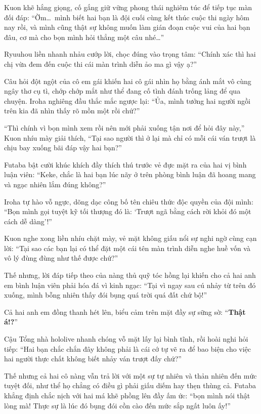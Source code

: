 \documentclass[../main.tex]{subfiles}
\begin{document}
Kuon khẽ hắng giọng, cố gắng giữ vững phong thái nghiêm túc để tiếp tục màn đối đáp: ``Ờm\dots\ mình biết hai bạn là đội cuối cùng kết thúc cuộc thi ngày hôm nay rồi, và mình cũng thật sự không muốn làm gián đoạn cuộc vui của hai bạn đâu, cơ mà cho bọn mình hỏi thẳng một câu nhé\dots''

Ryuuhou liền nhanh nhảu cướp lời, chọc đúng vào trọng tâm: ``Chính xác thì hai chị vừa đem đến cuộc thi cái màn trình diễn ảo ma gì vậy ạ?''

Câu hỏi đột ngột của cô em gái khiến hai cô gái nhìn họ bằng ánh mắt vô cùng ngây thơ cụ tì, chớp chớp mắt như thể đang cố tình đánh trống lảng để qua chuyện. Iroha nghiêng đầu thắc mắc ngược lại: ``Ủa, mình tưởng hai người ngồi trên kia đã nhìn thấy rõ mồn một rồi chứ?''

``Thì chính vì bọn mình xem rồi nên mới phải xuống tận nơi để hỏi đây này,'' Kuon nhíu mày giải thích, ``Tại sao người thì ở lại mà chỉ có mỗi cái ván trượt là chịu bay xuống bãi đáp vậy hai bạn?''

Futaba bật cười khúc khích đầy thích thú trước vẻ đực mặt ra của hai vị bình luận viên: ``Keke, chắc là hai bạn lúc nãy ở trên phòng bình luận đã hoang mang và ngạc nhiên lắm đúng không?''

Iroha tự hào vỗ ngực, dõng dạc công bố tên chiêu thức độc quyền của đội mình: ``Bọn mình gọi tuyệt kỹ tối thượng đó là: `Trượt ngã bằng cách rời khỏi đó một cách dễ dàng'!''

Kuon nghe xong liền nhíu chặt mày, vẻ mặt không giấu nổi sự nghi ngờ cùng cạn lời: ``Tại sao các bạn lại có thể đặt một cái tên màn trình diễn nghe huề vốn và vô lý đùng đùng như thế được chứ?''

Thế nhưng, lời đáp tiếp theo của nàng thủ quỹ tóc hồng lại khiến cho cả hai anh em bình luận viên phải hóa đá vì kinh ngạc: ``Tại vì ngay sau cú nhảy từ trên đó xuống, mình bỗng nhiên thấy đói bụng quá trời quá đất chứ bộ!''

Cả hai anh em đồng thanh hét lên, biểu cảm trên mặt đầy sự sững sờ: ``\textbf{Thật á!?}''

Cậu Tổng nhà hololive nhanh chóng vỗ mặt lấy lại bình tĩnh, rồi hoài nghi hỏi tiếp: ``Hai bạn chắc chắn đây không phải là cái cớ tự vẽ ra để bao biện cho việc hai người thực chất không biết nhảy ván trượt đấy chứ?''

Thế nhưng cả hai cô nàng vẫn trả lời với một sự tự nhiên và thản nhiên đến mức tuyệt đối, như thể họ chẳng có điều gì phải giấu diếm hay thẹn thùng cả. Futaba khẳng định chắc nịch với hai má khẽ phồng lên đầy ấm ức: ``bọn mình nói thật lòng mà! Thực sự là lúc đó bụng đói cồn cào đến mức sắp ngất luôn ấy!''
\end{document}
